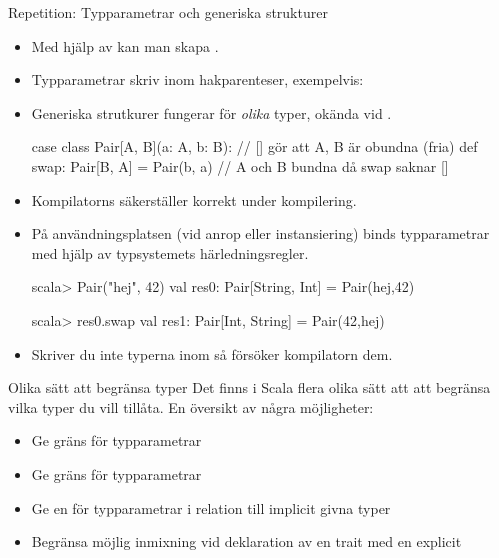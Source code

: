 



\begin{Slide}{Repetition: Typparametrar och generiska strukturer}
\begin{itemize}\SlideFontSmall
\item Med hjälp av   kan man skapa  .
\item Typparametrar skriv inom hakparenteser, exempelvis: \code{ [T, U] }
\item Generiska strutkurer fungerar för \emph{olika} typer, okända vid . 
\begin{Code}
case class Pair[A, B](a: A, b: B):  // [] gör att A, B är obundna (fria)
  def swap: Pair[B, A] = Pair(b, a) // A och B bundna då swap saknar []
\end{Code}
\item Kompilatorns säkerställer korrekt  under kompilering.
\item På användningsplatsen (vid anrop eller instansiering) binds typparametrar med hjälp av typsystemets härledningsregler. 
\begin{REPL}
scala> Pair("hej", 42)
val res0: Pair[String, Int] = Pair(hej,42)

scala> res0.swap
val res1: Pair[Int, String] = Pair(42,hej)
\end{REPL}
\item Skriver du inte typerna inom \code{[]} så försöker kompilatorn  dem.
\end{itemize}
\end{Slide}



\begin{Slide}{Olika sätt att begränsa typer}
Det finns i Scala flera olika sätt att att begränsa vilka typer du vill tillåta. En översikt av några möjligheter:
\begin{itemize}
  \item Ge  gräns för typparametrar 
  \item Ge  gräns för typparametrar 
  \item Ge en  för typparametrar i relation till implicit givna typer 
  \item Begränsa möjlig inmixning vid deklaration av en trait med en explicit   
\end{itemize}
\end{Slide}

